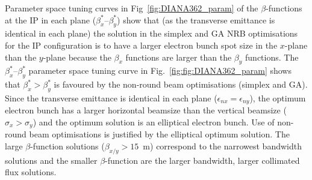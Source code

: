 \documentclass[../main.tex]{subfiles}
\begin{document}
Parameter space tuning curves in Fig~\ref{fig:DIANA362_param} of the $\beta$-functions at the IP in each plane ($\beta_{x}^{*}$--$\beta_{y}^{*}$) show that (as the transverse emittance is identical in each plane) the solution in the simplex and GA NRB optimisations for the IP configuration is to have a larger electron bunch spot size in the $x$-plane than the $y$-plane because the $\beta_{x}$ functions are larger than the $\beta_{y}$ functions. The $\beta_{x}^{*}$--$\beta_{y}^{*}$ parameter space tuning curve in Fig.~\ref{fig:fig:DIANA362_param} shows that $\beta_{x}^{*} > \beta_{y}^{*}$ is favoured by the non-round beam optimisations (simplex and GA). Since the transverse emittance is identical in each plane ($\epsilon_{nx} = \epsilon_{ny}$), the optimum electron bunch has a larger horizontal beamsize than the vertical beamsize ($\sigma_{x} > \sigma_{y}$) and the optimum solution is an elliptical electron bunch. Use of non-round beam optimisations is justified by the elliptical optimum solution. The large $\beta$-function solutions ($\beta_{x/y}>15$~\si{\meter}) correspond to the narrowest bandwidth solutions and the smaller $\beta$-function are the larger bandwidth, larger collimated flux solutions.
\end{document}
